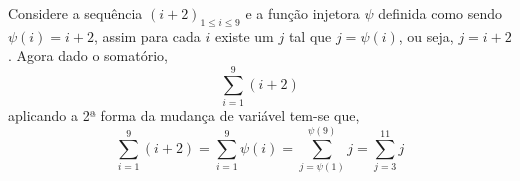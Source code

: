 \begin{exem}
	Considere a sequência $(i+2)_{1 \leq i \leq 9}$ e a função injetora $\psi$ definida como sendo $\psi(i) = i + 2$, assim para cada $i$ existe um $j$ tal que $j = \psi(i)$, ou seja, $j = i + 2$. Agora dado o somatório,  
	$$\displaystyle \sum_{i = 1}^{9} (i + 2)$$
	aplicando a 2ª forma da mudança de variável tem-se que, 
	$$\displaystyle \sum_{i = 1}^{9} (i + 2) = \sum_{i = 1}^{9} \psi(i) = \sum_{j = \psi(1)}^{\psi(9)} j =  \sum_{j = 3}^{11} j$$
\end{exem}